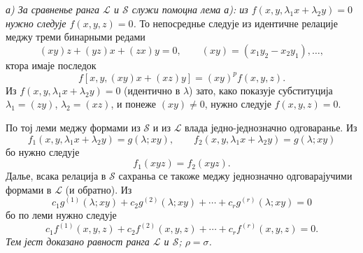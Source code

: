 \documentclass[11pt]{article}
\begin{document}
{\itshape а) За сравненье ранга $\mathcal L$ и $\mathcal S$ служи помоцна лема а): из $f(x,y,\lambda_1x+\lambda_2y)=0$ нужно следује $f(x,y,z)=0$.} То непосреднье следује из идентичне релације меджу треми бинарными редами
\[
  (xy)z+(yz)x+(zx)y=0,
  \qquad (xy)=(x_1y_2-x_2y_1),\ldots,
\]
ктора имаје последок
\[
  f[x,y,(xy)x+(xz)y]=(xy)^p f(x,y,z).
\]
Из $f(x,y,\lambda_1x+\lambda_2y)=0$ (идентично в $\lambda$) зато, како показује субституција $\lambda_1=(zy)$, $\lambda_2=(xz)$, и понеже $(xy)\ne0$, нужно следује $f(x,y,z)=0$.

По тој леми меджу формами из $\mathcal S$ и из $\mathcal L$ влада једно-једнозначно одговаранье. Из
\[
  f_1(x,y,\lambda_1x+\lambda_2y)=g(\lambda;xy),\qquad
  f_2(x,y,\lambda_1x+\lambda_2y)=g(\lambda;xy)
\]
бо нужно следује
\[
  f_1(xyz)=f_2(xyz).
\]
Далье, всака релација в $\mathcal S$ сахраньа се такоже меджу једнозначно одговарајучими формами в $\mathcal L$ (и обратно). Из
\[
  c_1g^{(1)}(\lambda;xy)+c_2g^{(2)}(\lambda;xy)+\cdots+c_rg^{(r)}(\lambda;xy)=0
\]
бо по леми нужно следује
\[
  c_1f^{(1)}(x,y,z)+c_2f^{(2)}(x,y,z)+\cdots+c_rf^{(r)}(x,y,z)=0.
\]
{\itshape Тем јест доказано равност ранга $\mathcal L$ и $\mathcal S$; $\rho=\sigma$.}
\end{document}
